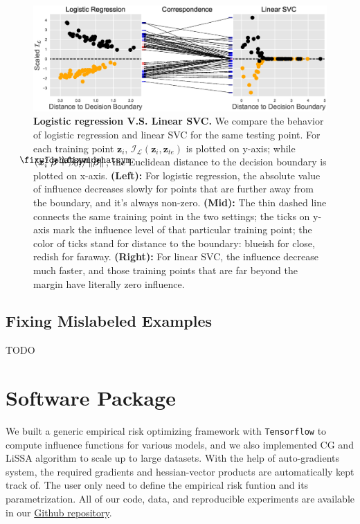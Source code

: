 \documentclass{article}
\newcommand\lowerwidehatsym{%
  \text{\smash{\raisebox{-1.3ex}{%
    $\fixwidehatsym$}}}}
\newcommand\fixwidehat[1]{%
  \mathchoice
    {\accentset{\displaystyle\lowerwidehatsym}{#1}}
    {\accentset{\textstyle\lowerwidehatsym}{#1}}
    {\accentset{\scriptstyle\lowerwidehatsym}{#1}}
    {\accentset{\scriptscriptstyle\lowerwidehatsym}{#1}}
}
\begin{document}
\setcounter{figure}{4}
\begin{figure}[h]
\vskip 0.0in
\begin{center}
\centerline{\includegraphics[width=\columnwidth]{fig-app1}}
\vskip -0.1in
\caption{\textbf{Logistic regression V.S. Linear SVC.} We compare the behavior of logistic regression and linear SVC for the same testing point. For each training point $\bm{z}_{i}$, $\mathcal{I}_{\mathcal{L}}(\bm{z}_{i}, \bm{z}_{te})$ is plotted on y-axis; while $ (\bm{x}_{i}^{\top}\fixwidehat{\bm{\beta}}+\beta_0) / \left\lVert \fixwidehat{\bm{\beta}}\right\rVert$, the Euclidean distance to the decision boundary is plotted on x-axis. \textbf{(Left):} For logistic regression, the absolute value of influence decreases slowly for points that are further away from the boundary, and it's always non-zero. \textbf{(Mid):} The thin dashed line connects the same training point in the two settings; the ticks on y-axis mark the influence level of that particular training point; the color of ticks stand for distance to the boundary: blueish for close, redish for faraway. \textbf{(Right):} For linear SVC, the influence decrease much faster, and those training points that are far beyond the margin have literally zero influence.} 
\label{model_behav_fig}
\end{center}
\vskip 0in
\end{figure}

\subsection{Fixing Mislabeled Examples}
TODO

\section{Software Package}
We built a generic empirical risk optimizing framework with \texttt{Tensorflow} to compute influence functions for various models, and we also implemented CG and LiSSA algorithm to scale up to large datasets. With the help of auto-gradients system, the required gradients and hessian-vector products are automatically kept track of. The user only need to define the empirical risk funtion and its parametrization. All of our code, data, and reproducible experiments are available in our \href{https://github.com/zedyang/46927-Project}{Github repository}.





\end{document}
